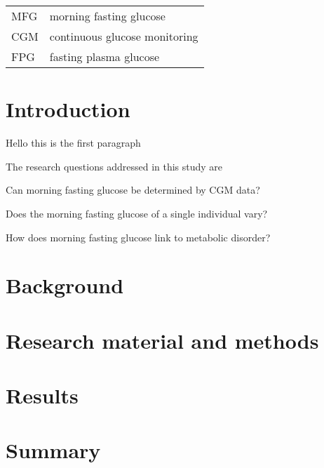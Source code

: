\documentclass[english, 12pt, a4paper, elec, utf8, a-1b, online]{aaltothesis}
\begin{document}
\begin{tabular}{ll}
MFG         & morning fasting glucose \\
CGM      & continuous glucose monitoring \\
FPG        & fasting plasma glucose \\ 
\end{tabular}

\cleardoublepage



\section{Introduction}
\thispagestyle{empty}

Hello this is the first paragraph

The research questions addressed in this study are
\begin{questions}[leftmargin=50pt]
    \item Can morning fasting glucose be determined by CGM data? 
    \item Does the morning fasting glucose of a single individual vary?
    \item How does morning fasting glucose link to metabolic disorder?\label{itm:qwithlabel}
\end{questions}

\clearpage


\section{Background}

\clearpage


\section{Research material and methods}

\clearpage


\section{Results}

\clearpage


\section{Summary} 

\clearpage





\clearpage

\thesisappendix
\end{document}
